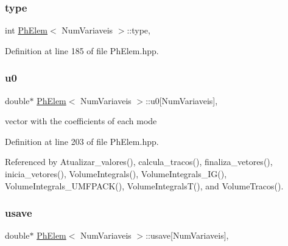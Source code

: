 \subsubsection{\texorpdfstring{type}{type}}
{\footnotesize\ttfamily int \hyperlink{classPhElem}{Ph\+Elem}$<$ Num\+Variaveis $>$\+::type\hspace{0.3cm}{\ttfamily [protected]}, {\ttfamily [inherited]}}



Definition at line 185 of file Ph\+Elem.\+hpp.

\mbox{\label{classPhElem_a560dc47ac8a684d84b05851ce52e044b}} 
\subsubsection{\texorpdfstring{u0}{u0}}
{\footnotesize\ttfamily double$\ast$ \hyperlink{classPhElem}{Ph\+Elem}$<$ Num\+Variaveis $>$\+::u0\mbox{[}Num\+Variaveis\mbox{]}\hspace{0.3cm}{\ttfamily [protected]}, {\ttfamily [inherited]}}



vector with the coefficients of each mode 



Definition at line 203 of file Ph\+Elem.\+hpp.



Referenced by Atualizar\+\_\+valores(), calcula\+\_\+tracos(), finaliza\+\_\+vetores(), inicia\+\_\+vetores(), Volume\+Integrals(), Volume\+Integrals\+\_\+\+I\+G(), Volume\+Integrals\+\_\+\+U\+M\+F\+P\+A\+C\+K(), Volume\+Integrals\+T(), and Volume\+Tracos().

\mbox{\label{classPhElem_a98781f3744597bad01eff75b31734d4b}} 
\subsubsection{\texorpdfstring{usave}{usave}}
{\footnotesize\ttfamily double$\ast$ \hyperlink{classPhElem}{Ph\+Elem}$<$ Num\+Variaveis $>$\+::usave\mbox{[}Num\+Variaveis\mbox{]}\hspace{0.3cm}{\ttfamily [protected]}, {\ttfamily [inherited]}}



